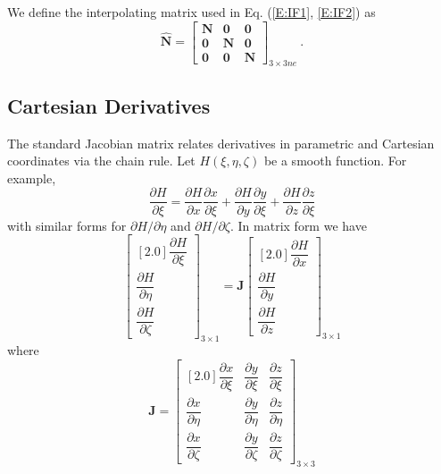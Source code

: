 \documentclass[11pt]{report}
\numberwithin{equation}{section}
\newcommand{\bmf } {\boldsymbol }  %
\newcommand{\nid}{\noindent}
\begin{document}
%
\nid We define the interpolating matrix used in Eq. (\ref{E:IF1}, \ref{E:IF2}) as 
%
\begin{equation}\label{E:IF5}
\hat {\mathbf{N}} = \begin{bmatrix} \bmf{N} &\bmf{ 0} & \bmf{0} \\
 \bmf{0} & \bmf{N} & \bmf{0} \\ 
\bmf{0} & \bmf{0} & \bmf{N} \end{bmatrix}_{3\times 3ne} \ .
\end{equation}
%

\subsection{Cartesian Derivatives}

\nid The standard Jacobian matrix relates derivatives in parametric 
and Cartesian coordinates via the chain rule. Let $H(\xi, \eta, \zeta)$ be a smooth
function. For example,
%
\begin{equation}\label{E:CDa}
\frac{\partial H}{\partial \xi} = \frac{\partial H}{\partial x} \frac{\partial x}{\partial \xi} + 
\frac{\partial H}{\partial y} \frac{\partial y}{\partial \xi} +
 \frac{\partial H}{\partial z} \frac{\partial z}{\partial \xi} 
\end{equation}
%
\nid with similar forms for $\partial H /\partial \eta$ and $\partial H /\partial \zeta$. In matrix form we have
%
\begin{equation}\label{E:CDb}
 \begin{bmatrix}[2.0]
 \dfrac{\partial H}{\partial \xi} \\ \dfrac{\partial H}{\partial \eta} \\\dfrac{\partial H}{\partial \zeta} 
 \end{bmatrix}_{3\times 1} = \mathbf{J}
 \begin{bmatrix}[2.0]
 \dfrac{\partial H}{\partial x } \\ \dfrac{\partial H}{\partial y} \\\dfrac{\partial H}{\partial z} 
 \end{bmatrix}_{3\times 1} 
\end{equation}
%
\nid where
%
\begin{equation}\label{E:CDc}
\mathbf{J} = \begin{bmatrix}[2.0]
 \dfrac{\partial x}{\partial \xi }  &  \dfrac{\partial y}{\partial \xi } & \dfrac{\partial z}{\partial \xi}  \\ 
\dfrac{\partial x}{\partial \eta }  &  \dfrac{\partial y}{\partial \eta } & \dfrac{\partial z}{\partial \eta}  \\ 
 \dfrac{\partial x}{\partial \zeta }  &  \dfrac{\partial y}{\partial \zeta } & \dfrac{\partial z}{\partial \zeta}  
 \end{bmatrix}_{3\times 3} 
\end{equation}
\end{document}

